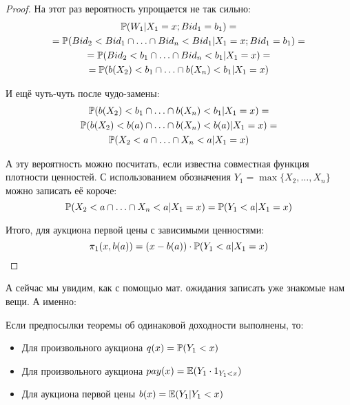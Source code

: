 \begin{proof}
На этот раз вероятность упрощается не так сильно:
\begin{multline}
\P(W_{1}|X_{1}=x ; Bid_{1}=b_{1})=\\
=\P(Bid_{2}<Bid_{1}\cap \ldots \cap Bid_{n}<Bid_{1}|X_{1}=x ; Bid_{1}=b_{1})=\\
=\P(Bid_{2}<b_{1}\cap \ldots \cap Bid_{n}<b_{1}|X_{1}=x)=\\
=\P(b(X_{2})<b_{1}\cap \ldots \cap b(X_{n})<b_{1}|X_{1}=x)
\end{multline}

И ещё чуть-чуть после чудо-замены:
\begin{multline}
\P(b(X_{2})<b_{1}\cap \ldots \cap b(X_{n})<b_{1}|X_{1}=x)=\\
\P(b(X_{2})<b(a)\cap \ldots \cap b(X_{n})<b(a)|X_{1}=x)=\\
\P(X_{2}<a\cap \ldots \cap X_{n}<a|X_{1}=x)
\end{multline}

А эту вероятность можно посчитать, если известна совместная функция плотности ценностей. С использованием обозначения $ Y_{1}=\max\{X_{2},\ldots, X_{n}\} $ можно записать её короче:
\begin{equation}
\P(X_{2}<a\cap \ldots \cap X_{n}<a|X_{1}=x)=\P(Y_{1}<a|X_{1}=x)
\end{equation}

Итого, для аукциона первой цены с зависимыми ценностями:
\begin{equation}
\pi_{1}(x,b(a))=(x-b(a))\cdot \P(Y_{1}<a|X_{1}=x)
\end{equation}
\end{proof}

А сейчас мы увидим, как с помощью мат. ожидания записать уже знакомые нам вещи. А именно:

\begin{myth} Если предпосылки теоремы об одинаковой доходности выполнены, то:
\label{probabilistic_interpretation}
\begin{itemize}
\item Для произвольного аукциона $ q(x)=\P(Y_{1}<x) $
\item Для произвольного аукциона $ pay(x)=\E(Y_{1}\cdot 1_{Y_{1}<x}) $
\item Для аукциона первой цены $ b(x)=\E(Y_{1}|Y_{1}<x) $
\end{itemize}
\end{myth}

